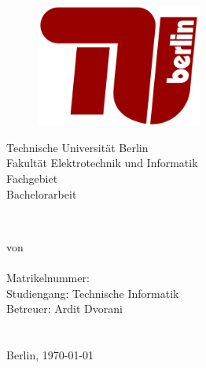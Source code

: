 
\newsavebox{\Prof}

\newsavebox{\Betr}
\begin{titlepage}



	\begin{figure}
		\begin{center}
			\includegraphics[height=4cm]{source/images/Logo/TU_Berlin_Logo.png}
		\end{center}
	\end{figure}

	\begin{center}

	{\Large Technische Universität Berlin}\\[1mm]
	{\large Fakultät Elektrotechnik und Informatik}\\
	{\large Fachgebiet \Fachgebiet}\\
	\vspace{1cm}
	{\LARGE  Bachelorarbeit}

	\vspace{0.5cm}

	{\LARGE\textbf{ \TitelArbeit}}\\


	\vspace{1cm}

	von\\[2mm]

	\textbf{\large{\DeinName}}\\
	Matrikelnummer: \MatrNo\\

	Studiengang: Technische Informatik\\[1.5cm]

	Betreuer: Ardit Dvorani\\[2mm]

	\usebox{\Prof: \PrueferEins} \\
	\usebox{\Betr: \PrueferZwei} \\

	\vspace{1cm}
	Berlin, \today
	\end{center}
\end{titlepage}